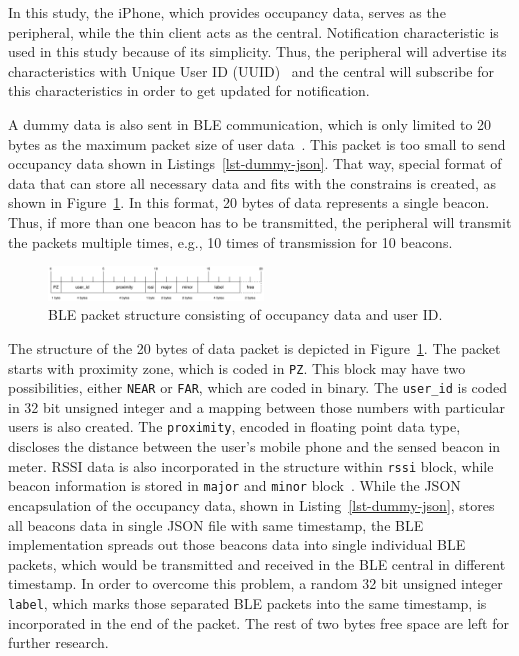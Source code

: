 \documentclass[journal]{vgtc}                %
\begin{document}
In this study, the iPhone, which provides occupancy data, serves as the peripheral, while the thin client acts as the central. Notification characteristic is used in this study because of its simplicity. Thus, the peripheral will advertise its characteristics with Unique User ID (UUID)~\cite{BluetoothSpecialInterestGroup2014} and the central will subscribe for this characteristics in order to get updated for notification.

A dummy data is also sent in BLE communication, which is only limited to 20 bytes as the maximum packet size of user data~\cite{BluetoothSpecialInterestGroup2014}. This packet is too small to send occupancy data shown in Listings~\ref{lst-dummy-json}. That way, special format of data that can store all necessary data and fits with the constrains is created, as shown in Figure~\ref{fig:ble-packet-structure}. In this format, 20 bytes of data represents a single beacon. Thus, if more than one beacon has to be transmitted, the peripheral will transmit the packets multiple times, e.g., 10 times of transmission for 10 beacons.

\begin{figure}
  \centering
    \includegraphics[width=0.51\textwidth]{ble-packet-structure}
  \caption{BLE packet structure consisting of occupancy data and user ID.}
  \label{fig:ble-packet-structure}
\end{figure}

The structure of the 20 bytes of data packet is depicted in Figure~\ref{fig:ble-packet-structure}. The packet starts with proximity zone, which is coded in \texttt{PZ}. This block may have two possibilities, either \texttt{NEAR} or \texttt{FAR}, which are coded in binary. The \verb|user_id| is coded in 32 bit unsigned integer and a mapping between those numbers with particular users is also created. The \verb|proximity|, encoded in floating point data type, discloses the distance between the user's mobile phone and the sensed beacon in meter. RSSI data is also incorporated in the structure within \verb|rssi| block, while beacon information is stored in \verb|major| and \verb|minor| block~\cite{AppleInc.2014}. While the JSON encapsulation of the occupancy data, shown in Listing~\ref{lst-dummy-json}, stores all beacons data in single JSON file with same timestamp, the BLE implementation spreads out those beacons data into single individual BLE packets, which would be transmitted and received in the BLE central in different timestamp. In order to overcome this problem, a random 32 bit unsigned integer \verb|label|, which marks those separated BLE packets into the same timestamp, is incorporated in the end of the packet. The rest of two bytes free space are left for further research.
\end{document}
